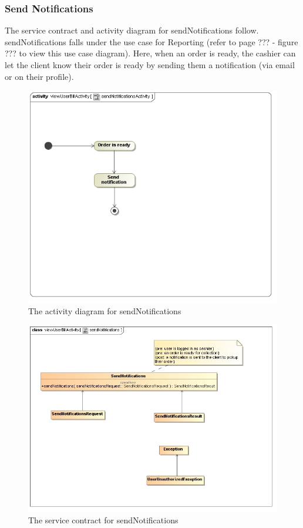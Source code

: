 \documentclass[a4paper,12pt]{report}
\begin{document}
\subsubsection{Send Notifications}
The service contract and activity diagram for sendNotifications follow. sendNotifications falls under the use case for Reporting (refer to page ??? - figure ??? to view this use case diagram). Here, when an order is ready, the cashier can let the client know their order is ready by sending them a notification (via email or on their profile).

\begin{figure}[H]
  \centering
    \includegraphics[width=1.0\textwidth]{../images/sendNotificationsActivity.jpg}
    \caption{The activity diagram for sendNotifications} 
\end{figure}
\begin{figure}[H]
  \centering
    \includegraphics[width=1.0\textwidth]{../images/sendNotifications.jpg}
    \caption{The service contract for sendNotifications} 
\end{figure}
\end{document}
